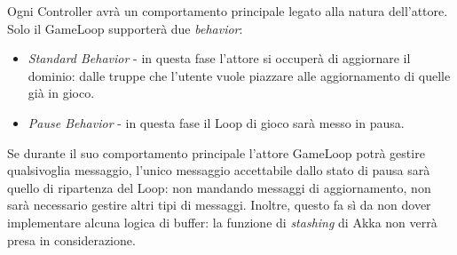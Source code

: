 Ogni Controller avrà un comportamento principale legato alla natura dell'attore.
Solo il GameLoop supporterà due \textit{behavior}:
\begin{itemize}
    \item \textit{Standard Behavior} - in questa fase l'attore si occuperà di aggiornare il dominio: dalle truppe
    che l'utente vuole piazzare alle aggiornamento di quelle già in gioco.
    \item \textit{Pause Behavior} - in questa fase il Loop di gioco sarà messo in pausa.
\end{itemize}
Se durante il suo comportamento principale l'attore GameLoop potrà gestire qualsivoglia messaggio,
l'unico messaggio accettabile dallo stato di pausa sarà quello di ripartenza del Loop: non mandando messaggi di aggiornamento,
non sarà necessario gestire altri tipi di messaggi. Inoltre, questo fa sì da non dover implementare alcuna logica di buffer:
la funzione di \textit{stashing} di Akka non verrà presa in considerazione.



